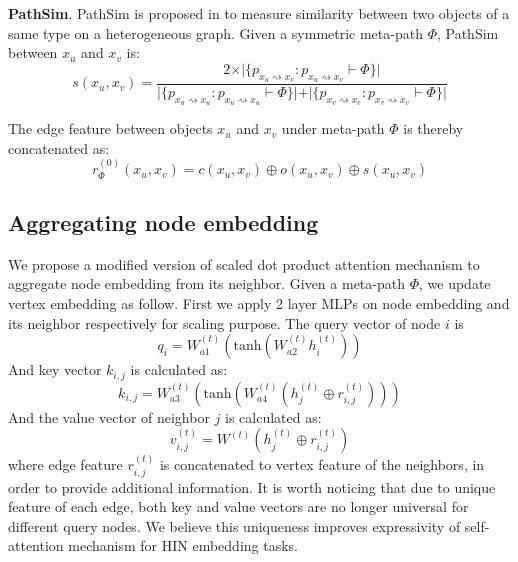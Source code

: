 \noindent{\small$\bullet$}\textbf{PathSim}. 
PathSim is proposed in \citep{SunHYYW11} to measure similarity between two objects of a same type on a heterogeneous graph. Given a symmetric meta-path $\Phi$, PathSim between $x_u$ and $x_v$ is:
\begin{equation*}
s(x_u,x_v) = \frac{2\times\vert\{ p_{x_u \rightsquigarrow x_v}:p_{x_u \rightsquigarrow x_v} \vdash \Phi \}\vert}{\vert\{ p_{x_u \rightsquigarrow x_u}:p_{x_u \rightsquigarrow x_u} \vdash \Phi \}\vert +\vert\{ p_{x_v \rightsquigarrow x_v}:p_{x_v \rightsquigarrow x_v} \vdash \Phi \}\vert }
\end{equation*}

The edge feature between objects $x_u$ and $x_v$ under meta-path $\Phi$ is thereby concatenated as:
\begin{equation}
\label{eq:edge}
r^{(0)}_\Phi(x_u,x_v) = c(x_u,x_v)\oplus o(x_u,x_v)\oplus s(x_u,x_v)
\end{equation}

\subsection{Aggregating node embedding}
We propose a modified version of scaled dot product attention mechanism to aggregate node embedding from its neighbor. Given a meta-path $\Phi$, we update vertex embedding as follow. First we apply 2 layer MLPs on node embedding and its neighbor respectively for scaling purpose. The query vector of node $i$ is
\begin{equation}
\label{eq:query}
q_i= W_{a1}^{(t)}(\text{tanh}(W_{a2}^{(t)}h^{(t)}_i ))
\end{equation}
And key vector $k_{i,j}$ is calculated as:
\begin{equation}
\label{eq:key}
k_{i,j} = W_{a3}^{(t)}(\text{tanh}(W_{a4}^{(t)}(h^{(t)}_j \oplus r^{(t)}_{i,j}) ))
\end{equation}
And the value vector of neighbor $j$ is calculated as: 
\begin{equation}
\label{eq:value}
v^{(t)}_{i,j} = W^{(t)}( h^{(t)}_j \oplus r^{(t)}_{i,j} )
\end{equation} 
where edge feature $r^{(t)}_{i,j}$ is concatenated to vertex feature of the neighbors, in order to provide additional information. It is worth noticing that due to unique feature of each edge, both key and value vectors are no longer universal for different query nodes. We believe this uniqueness improves expressivity of self-attention mechanism for HIN embedding tasks.


